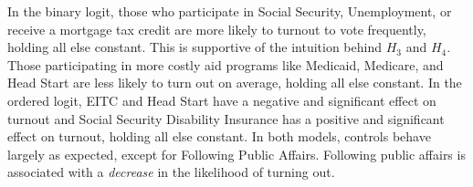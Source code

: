 \documentclass[12pt]{paper}
\begin{document}
In the binary logit, those who participate in Social Security, Unemployment, or receive a mortgage tax credit are more likely to turnout to vote frequently, holding all else constant. This is supportive of the intuition behind $H_3$ and $H_4$. Those participating in more costly aid programs like Medicaid, Medicare, and Head Start are less likely to turn out on average, holding all else constant. In the ordered logit, EITC and Head Start have a negative and significant effect on turnout and Social Security Disability Insurance has a positive and significant effect on turnout, holding all else constant. In both models, controls behave largely as expected, except for Following Public Affairs. Following public affairs is associated with a \textit{decrease} in the likelihood of turning out.

\end{document}
